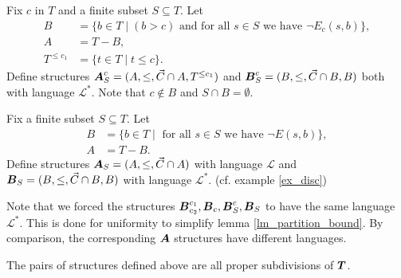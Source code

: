 \documentclass{amsart}
\DeclareMathOperator{\TT}{\boldface T}
\DeclareMathOperator{\AT}{\boldface A}
\DeclareMathOperator{\BT}{\boldface B}
\renewcommand{\LL}{\mathcal L}
\newcommand{\LLU}{\LL^*}
\begin{document}
\begin{Definition}
  Fix $c$ in $T$ and  a finite subset $S \subseteq T$. Let
  \begin{align*}
    B &= \{b \in T \mid (b > c) \text{ and for all $s \in S$ we have } \neg E_c(s, b)\}, \\
    A &= T - B, \\
    T^{\leq c_1} &= \{t \in T \mid t \leq c\}.
  \end{align*}
  Define structures $\AT^{c}_{S} = (A, \leq, \vec C\cap A, T^{\leq c_1})$ and $\BT^{c}_{S} = (B, \leq, \vec C\cap B, B)$ both with language $\LLU$.
  Note that $c \notin B$ and $S \cap B = \emptyset$.
\end{Definition}

\begin{Definition}
  Fix  a finite subset $S \subseteq T$. Let
  \begin{align*}
    B &= \{b \in T \mid \text{ for all $s \in S$ we have } \neg E(s, b)\}, \\
    A &= T - B.
  \end{align*}
  Define structures $\AT_{S} = (A, \leq, \vec C \cap A)$ with language $\LL$ and $\BT_{S} = (B, \leq, \vec C\cap B, B)$ with language $\LLU$.
  (cf. example \ref{ex_disc})
\end{Definition}

Note that we forced the structures $\BT^{c_1}_{c_2}, \BT_c, \BT^{c}_{S}, \BT_{S}$ to have the same language $\LLU$.
This is done for uniformity to simplify lemma \ref{lm_partition_bound}.
By comparison, the corresponding $\AT$ structures have different languages.

\begin{Lemma} \label{subdivide}
  The pairs of structures defined above are all proper subdivisions of $\TT$.
\end{Lemma}
\end{document}
